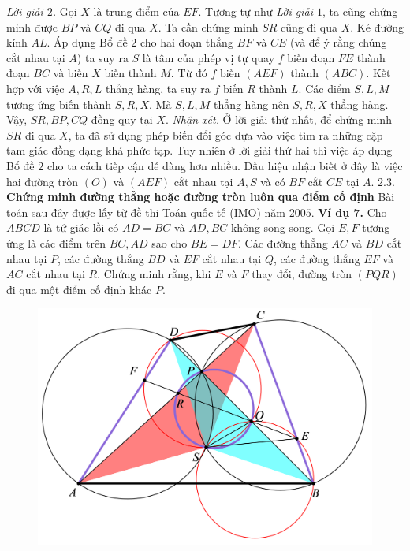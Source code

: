 \begin{multicols}{2}
	\vskip 0.1cm
	\textit{Lời giải $2$.} Gọi $X$ là trung điểm của $EF$. Tương tự như \textit{Lời giải $1$}, ta cũng chứng minh được $BP$ và $CQ$ đi qua $X$. Ta cần chứng minh $SR$ cũng đi qua $X$. Kẻ đường kính $AL$. Áp dụng Bổ đề $2$ cho hai đoạn thẳng $BF$ và $CE$ (và để ý rằng chúng cắt nhau tại $A$) ta suy ra $S$ là tâm của phép vị tự quay $f$ biến đoạn $FE$ thành đoạn $BC$ và biến $X$ biến thành $M$. Từ đó $f$ biến $(AEF)$ thành $(ABC)$. Kết hợp với việc $A,R,L$ thẳng hàng, ta suy ra $f$ biến $R$ thành $L$. Các điểm $S,L,M$ tương ứng biến thành $S,R,X$. Mà  $S,L,M$ thẳng hàng nên $S,R,X$ thẳng hàng. Vậy, $SR,BP,CQ$ đồng quy tại $X$.
	\vskip 0.1cm
	\textit{Nhận xét.} Ở lời giải thứ nhất, để chứng minh $SR$ đi qua $X$, ta đã sử dụng phép biến đổi góc dựa vào việc tìm ra những cặp tam giác đồng dạng khá phức tạp. Tuy nhiên ở lời giải thứ hai thì việc áp dụng Bổ đề $2$ cho ta cách tiếp cận dễ dàng hơn nhiều. Dấu hiệu nhận biết ở đây là việc hai đường tròn $(O)$ và $(AEF)$ cắt nhau tại $ A,S$ và có $BF$ cắt $CE$ tại $A$.
	\vskip 0.1cm 
	$\pmb{2.3.}$ \textbf{\color{diendantoanhoc} Chứng minh đường thẳng hoặc đường tròn luôn qua điểm cố định}
	\vskip 0.1cm
	Bài toán sau đây được lấy từ đề thi Toán quốc tế (IMO) năm $2005$.
	\vskip 0.1cm
	\textbf{\color{diendantoanhoc}Ví dụ $\pmb{7}$.} Cho $ABCD$ là tứ giác lồi có $AD=BC$ và $AD,BC$ không song song. Gọi $E,F$ tương ứng  là các điểm trên $BC,AD$ sao cho $BE=DF$. Các đường thẳng  $AC$ và $BD$ cắt nhau tại $P$, các đường thẳng $BD$ và $EF$ cắt nhau tại $Q$, các đường thẳng $EF$ và $AC$ cắt nhau tại $R$. Chứng minh rằng, khi $E$ và $F$ thay đổi, đường tròn $(PQR)$ đi qua một điểm cố định khác $P$.
	\begin{figure}[H]
		\vspace*{-5pt}
		\centering
		\captionsetup{labelformat= empty, justification=centering}
		\includegraphics[width= 1.02\linewidth]{14}

\end{figure}
\end{multicols}
